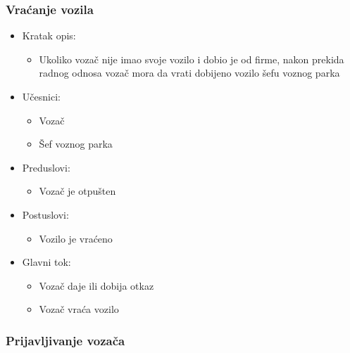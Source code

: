 \subsubsection{\bfseries Vraćanje vozila}
\begin{itemize}
	\item Kratak opis:
		\begin{itemize}
			\item Ukoliko vozač nije imao svoje vozilo i dobio je od firme, nakon prekida radnog odnosa vozač mora da vrati dobijeno vozilo šefu voznog parka
		\end{itemize}

	\item Učesnici:
		\begin{itemize}
		    \item Vozač
		    \item Šef voznog parka
		\end{itemize}


	\item Preduslovi:
		\begin{itemize}
		    \item Vozač je otpušten
		\end{itemize}


	\item Postuslovi:
		\begin{itemize}
			\item Vozilo je vraćeno
	\end{itemize}

	\item Glavni tok:
		\begin{itemize}
		    \item Vozač daje ili dobija otkaz
		    \item Vozač vraća vozilo
		\end{itemize}

\end{itemize}
\subsubsection{\bfseries Prijavljivanje vozača}

